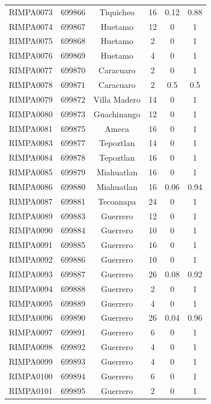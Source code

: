 \documentclass[11pt]{article}
\newcounter{rowno}
\begin{document}
\begin{scriptsize}
\begin{longtable}{>{\stepcounter{rowno}}cccccc}
    RIMPA0073 & 699866 & Tiquicheo & 16    & 0.12 & 0.88 \\
    RIMPA0074 & 699867 & Huetamo & 12    & 0     & 1 \\
    RIMPA0075 & 699868 & Huetamo & 2     & 0     & 1 \\
    RIMPA0076 & 699869 & Huetamo & 4     & 0     & 1 \\
    RIMPA0077 & 699870 & Caracuaro & 2     & 0     & 1 \\
    RIMPA0078 & 699871 & Caracuaro & 2     & 0.5   & 0.5 \\
    RIMPA0079 & 699872 & Villa Madero & 14    & 0     & 1 \\
    RIMPA0080 & 699873 & Guachinango & 12    & 0     & 1 \\
    RIMPA0081 & 699875 & Ameca & 16    & 0     & 1 \\
    RIMPA0083 & 699877 & Tepoztlan & 14    & 0     & 1 \\
    RIMPA0084 & 699878 & Tepoztlan & 16    & 0     & 1 \\
    RIMPA0085 & 699879 & Miahuatlan & 16    & 0     & 1 \\
    RIMPA0086 & 699880 & Miahuatlan & 16    & 0.06 & 0.94 \\
    RIMPA0087 & 699881 & Tecoanapa & 24    & 0     & 1 \\
    RIMPA0089 & 699883 & Guerrero & 12    & 0     & 1 \\
    RIMPA0090 & 699884 & Guerrero & 10    & 0     & 1 \\
    RIMPA0091 & 699885 & Guerrero & 16    & 0     & 1 \\
    RIMPA0092 & 699886 & Guerrero & 10    & 0     & 1 \\
    RIMPA0093 & 699887 & Guerrero & 26    & 0.08 & 0.92 \\
    RIMPA0094 & 699888 & Guerrero & 2     & 0     & 1 \\
    RIMPA0095 & 699889 & Guerrero & 4     & 0     & 1 \\
    RIMPA0096 & 699890 & Guerrero & 26    & 0.04 & 0.96 \\
    RIMPA0097 & 699891 & Guerrero & 6     & 0     & 1 \\
    RIMPA0098 & 699892 & Guerrero & 4     & 0     & 1 \\
    RIMPA0099 & 699893 & Guerrero & 4     & 0     & 1 \\
    RIMPA0100 & 699894 & Guerrero & 6     & 0     & 1 \\
    RIMPA0101 & 699895 & Guerrero & 2     & 0     & 1 \\

\end{longtable}
\end{scriptsize}
\end{document}
